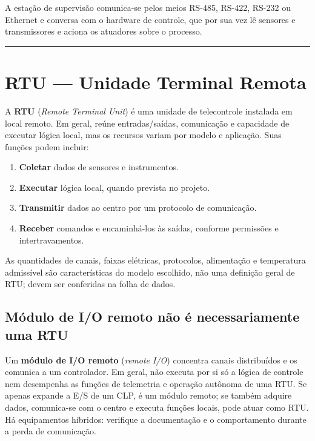 A estação de supervisão comunica-se pelos meios RS-485, RS-422, RS-232 ou Ethernet e conversa
com o hardware de controle, que por sua vez lê sensores e transmissores e aciona os atuadores
sobre o processo.

\begin{center}\rule{0.5\linewidth}{0.5pt}\end{center}

\section{\texorpdfstring{RTU --- Unidade Terminal Remota}{RTU  Unidade Terminal Remota}}\label{rtu-unidade-terminal-remota}

A \textbf{RTU} (\emph{Remote Terminal Unit}) é uma unidade de telecontrole instalada em local remoto. Em
geral, reúne entradas/saídas, comunicação e capacidade de executar lógica local, mas os recursos
variam por modelo e aplicação. Suas funções podem incluir:

\begin{enumerate}
\def\labelenumi{\arabic{enumi}.}
\tightlist
\item
  \textbf{Coletar} dados de sensores e instrumentos.
\item
  \textbf{Executar} lógica local, quando prevista no projeto.
\item
  \textbf{Transmitir} dados ao centro por um protocolo de comunicação.
\item
  \textbf{Receber} comandos e encaminhá-los às saídas, conforme permissões e intertravamentos.
\end{enumerate}

As quantidades de canais, faixas elétricas, protocolos, alimentação e temperatura admissível são
características do modelo escolhido, não uma definição geral de RTU; devem ser conferidas na folha
de dados.

\subsection{Módulo de I/O remoto não é necessariamente uma RTU}\label{muxf3dulo-de-io-remoto-nuxe3o-uxe9-necessariamente-uma-rtu}

Um \textbf{módulo de I/O remoto} (\emph{remote I/O}) concentra canais distribuídos e os comunica a um
controlador. Em geral, não executa por si só a lógica de controle nem desempenha as funções de
telemetria e operação autônoma de uma RTU. Se apenas expande a E/S de um CLP, é um módulo remoto; se
também adquire dados, comunica-se com o centro e executa funções locais, pode atuar como RTU. Há
equipamentos híbridos: verifique a documentação e o comportamento durante a perda de comunicação.

